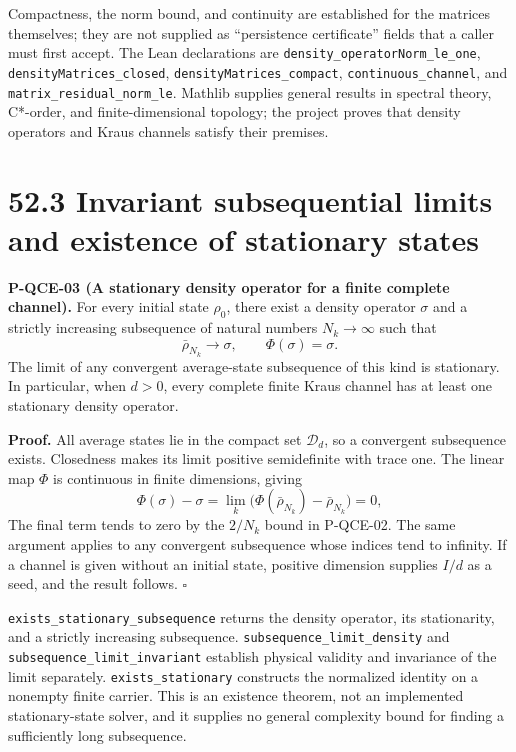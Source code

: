 \documentclass[
  11pt,
  oneside]{book}
\begin{document}
Compactness, the norm bound, and continuity are established for the
matrices themselves; they are not supplied as ``persistence
certificate'' fields that a caller must first accept. The Lean
declarations are \texttt{density\_\allowbreak operator\allowbreak Norm\_\allowbreak le\_\allowbreak one},
\texttt{density\allowbreak Matrices\_\allowbreak closed}, \texttt{density\allowbreak Matrices\_\allowbreak compact},
\texttt{continuous\_\allowbreak channel}, and \texttt{matrix\_\allowbreak residual\_\allowbreak norm\_\allowbreak le}.
Mathlib supplies general results in spectral theory, C*-order, and
finite-dimensional topology; the project proves that density operators
and Kraus channels satisfy their premises.

\section{52.3 Invariant subsequential limits and existence of stationary
states}

\label{p-qce-03}{}

\textbf{P-QCE-03 (A stationary density operator for a finite complete
channel).} For every initial state \(\rho_0\), there exist a density
operator \(\sigma\) and a strictly increasing subsequence of natural
numbers \(N_k\to\infty\) such that \[
\bar\rho_{N_k}\longrightarrow\sigma,\qquad \Phi(\sigma)=\sigma.
\] The limit of any convergent average-state subsequence of this kind is
stationary. In particular, when \(d>0\), every complete finite Kraus
channel has at least one stationary density operator.

\textbf{Proof.} All average states lie in the compact set
\(\mathcal D_d\), so a convergent subsequence exists. Closedness makes
its limit positive semidefinite with trace one. The linear map \(\Phi\)
is continuous in finite dimensions, giving \[
\Phi(\sigma)-\sigma
=\lim_k\bigl(\Phi(\bar\rho_{N_k})-\bar\rho_{N_k}\bigr)=0,
\] The final term tends to zero by the \(2/N_k\) bound in P-QCE-02. The
same argument applies to any convergent subsequence whose indices tend
to infinity. If a channel is given without an initial state, positive
dimension supplies \(I/d\) as a seed, and the result follows.
\(\square\)

\texttt{exists\_\allowbreak stationary\_\allowbreak subsequence} returns the density operator,
its stationarity, and a strictly increasing subsequence.
\texttt{subsequence\_\allowbreak limit\_\allowbreak density} and
\texttt{subsequence\_\allowbreak limit\_\allowbreak invariant} establish physical validity and
invariance of the limit separately. \texttt{exists\_\allowbreak stationary}
constructs the normalized identity on a nonempty finite carrier. This is
an existence theorem, not an implemented stationary-state solver, and it
supplies no general complexity bound for finding a sufficiently long
subsequence.
\end{document}

